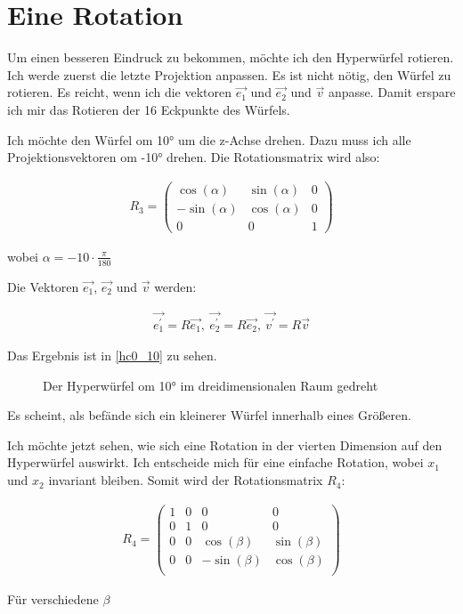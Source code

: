 \documentclass[10pt,a4paper,twoside,titlepage]{article}
\newcommand{\myeq}[2]{
	\begin{equation}
		\begin{split}
			#1
		\end{split}
		\label{#2}
	\end{equation}
}
\newcommand{\psimg}[3]{
    \begin{figure}[!ht]
        \centering
        
        \caption{#2}
        #3
    \end{figure}
}
\begin{document}
\section{Eine Rotation}
Um einen besseren Eindruck zu bekommen, möchte ich den Hyperwürfel rotieren.
Ich werde zuerst die letzte Projektion anpassen. Es ist nicht nötig, den
Würfel zu rotieren. Es reicht, wenn ich die vektoren $\vec{e_1}$ und
$\vec{e_2}$ und $\vec{v}$ anpasse. Damit erspare ich mir das Rotieren der
16 Eckpunkte des Würfels.

Ich möchte den Würfel om 10° um die z-Achse drehen. Dazu muss ich alle Projektionsvektoren om -10° drehen. Die Rotationsmatrix wird also:
\myeq{ R_3 = 
    \begin{pmatrix}
        \cos(\alpha) & \sin(\alpha) & 0\\
        -\sin(\alpha) &\cos(\alpha) & 0\\
        0 & 0 & 1
    \end{pmatrix}
}{rot1}
wobei $\alpha = -10 \cdot \frac{\pi}{180}$

Die Vektoren $\vec{e_1}$, $\vec{e_2}$ und $\vec{v}$ werden:
\myeq{\vec{e^\prime_1} = R \vec{e_1},\  
    \vec{e^\prime_2} = R \vec{e_2},\ 
    \vec{v^\prime} = R \vec{v}}{rot2}

Das Ergebnis ist in \autoref{hc0_10} zu sehen.

\psimg{python/hc0_10.tex}{Der Hyperwürfel om 10° im dreidimensionalen 
    Raum gedreht}{\label{hc0_10}}

Es scheint, als befände sich ein kleinerer Würfel innerhalb 
eines Größeren.

Ich möchte jetzt sehen, wie sich eine Rotation in der vierten Dimension
auf den Hyperwürfel auswirkt. Ich entscheide mich für eine einfache
Rotation, wobei $x_1$ und $x_2$ invariant bleiben. Somit wird der 
Rotationsmatrix $R_4$:
\myeq{R_4 = 
    \begin{pmatrix}
         1&0&0&0\\
         0&1&0&0\\
        0&0&\cos(\beta)&\sin(\beta)\\
        0&0&-\sin(\beta)&\cos(\beta)\\
    \end{pmatrix}    
}{rot3}
Für verschiedene $\beta$
\end{document}
